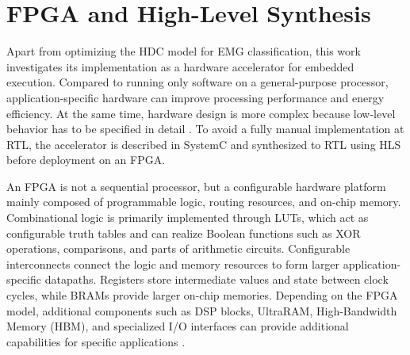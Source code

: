     

    \section{FPGA and High-Level Synthesis}
    \label{sec:FPGA_background}
    Apart from optimizing the HDC model for EMG classification, this work investigates its implementation as a hardware accelerator for embedded execution. Compared to running only software on a general-purpose processor, application-specific hardware can improve processing performance and energy efficiency. At the same time, hardware design is more complex because low-level behavior has to be specified in detail \cite{nane_survey_2016}. To avoid a fully manual implementation at \ac{RTL}, the accelerator is described in SystemC and synthesized to \ac{RTL} using \ac{HLS} before deployment on an \ac{FPGA}.

        An \ac{FPGA} is not a sequential processor, but a configurable hardware platform mainly composed of programmable logic, routing resources, and on-chip memory. Combinational logic is primarily implemented through \acp{LUT}, which act as configurable truth tables and can realize Boolean functions such as XOR operations, comparisons, and parts of arithmetic circuits.
        Configurable interconnects connect the logic and memory resources to form larger application-specific datapaths. Registers store intermediate values and state between clock cycles, while \acp{BRAM} provide larger on-chip memories. Depending on the \ac{FPGA} model, additional components such as \ac{DSP} blocks, UltraRAM, High-Bandwidth Memory (HBM), and specialized I/O interfaces can provide additional capabilities for specific applications \cite{fang_-memory_2020}.
        
